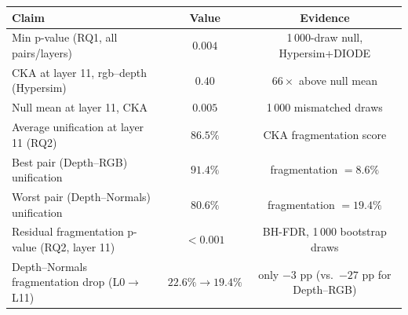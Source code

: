 \documentclass[11pt, a4paper]{article}
\begin{document}
\begin{center}
\begin{tabular}{lcc}
\toprule
\textbf{Claim} & \textbf{Value} & \textbf{Evidence} \\
\midrule
Min p-value (RQ1, all pairs/layers)            & $0.004$           & 1\,000-draw null, Hypersim+DIODE \\
CKA at layer 11, rgb--depth (Hypersim)         & $0.40$            & $66\times$ above null mean \\
Null mean at layer 11, CKA                     & $0.005$           & 1\,000 mismatched draws \\
Average unification at layer 11 (RQ2)          & $86.5\%$          & CKA fragmentation score \\
Best pair (Depth--RGB) unification             & $91.4\%$          & fragmentation $= 8.6\%$ \\
Worst pair (Depth--Normals) unification        & $80.6\%$          & fragmentation $= 19.4\%$ \\
Residual fragmentation p-value (RQ2, layer 11) & $< 0.001$         & BH-FDR, 1\,000 bootstrap draws \\
Depth--Normals fragmentation drop (L0$\to$L11) & $22.6\% \to 19.4\%$ & only $-3$ pp (vs.\ $-27$ pp for Depth--RGB) \\
\bottomrule
\end{tabular}
\end{center}
\end{document}
